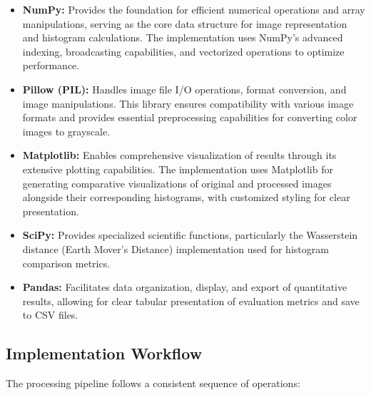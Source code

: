 \documentclass[12pt,a4paper]{article}
\begin{document}
\begin{itemize}
    \item \textbf{NumPy:} Provides the foundation for efficient numerical operations and array manipulations, serving as the core data structure for image representation and histogram calculations. The implementation uses NumPy's advanced indexing, broadcasting capabilities, and vectorized operations to optimize performance.
    
    \item \textbf{Pillow (PIL):} Handles image file I/O operations, format conversion, and image manipulations. This library ensures compatibility with various image formats and provides essential preprocessing capabilities for converting color images to grayscale.
    
    \item \textbf{Matplotlib:} Enables comprehensive visualization of results through its extensive plotting capabilities. The implementation uses Matplotlib for generating comparative visualizations of original and processed images alongside their corresponding histograms, with customized styling for clear presentation.
        \item \textbf{SciPy:} Provides specialized scientific functions, particularly the Wasserstein distance (Earth Mover's Distance) implementation used for histogram comparison metrics.
    
    \item \textbf{Pandas:} Facilitates data organization, display, and export of quantitative results, allowing for clear tabular presentation of evaluation metrics and save to CSV files.

\end{itemize}


\subsection{Implementation Workflow}

The processing pipeline follows a consistent sequence of operations:
\end{document}

